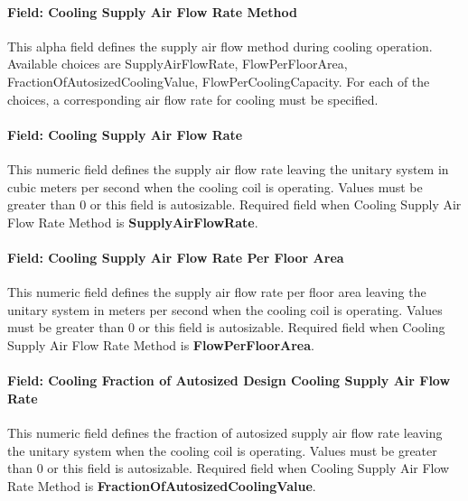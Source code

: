 \paragraph{Field: Cooling Supply Air Flow Rate Method}\label{field-cooling-supply-air-flow-rate-method-000}

This alpha field defines the supply air flow method during cooling operation. Available choices are SupplyAirFlowRate, FlowPerFloorArea, FractionOfAutosizedCoolingValue, FlowPerCoolingCapacity. For each of the choices, a corresponding air flow rate for cooling must be specified.

\paragraph{Field: Cooling Supply Air Flow Rate}\label{field-cooling-supply-air-flow-rate-001}

This numeric field defines the supply air flow rate leaving the unitary system in cubic meters per second when the cooling coil is operating. Values must be greater than 0 or this field is autosizable. Required field when Cooling Supply Air Flow Rate Method is \textbf{SupplyAirFlowRate}.

\paragraph{Field: Cooling Supply Air Flow Rate Per Floor Area}\label{field-cooling-supply-air-flow-rate-per-floor-area}

This numeric field defines the supply air flow rate per floor area leaving the unitary system in meters per second when the cooling coil is operating. Values must be greater than 0 or this field is autosizable. Required field when Cooling Supply Air Flow Rate Method is \textbf{FlowPerFloorArea}.

\paragraph{Field: Cooling Fraction of Autosized Design Cooling Supply Air Flow Rate}\label{field-cooling-fraction-of-autosized-design-cooling-supply-air-flow-rate}

This numeric field defines the fraction of autosized supply air flow rate leaving the unitary system when the cooling coil is operating. Values must be greater than 0 or this field is autosizable. Required field when Cooling Supply Air Flow Rate Method is \textbf{FractionOfAutosizedCoolingValue}.

